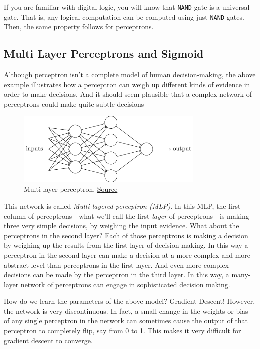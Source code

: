 \documentclass[a4paper]{tufte-handout}
\begin{document}
If you are familiar with digital logic, you will know that \texttt{NAND}
gate is a universal gate. That is, any logical computation can be
computed using just \texttt{NAND} gates. Then, the same property follows
for perceptrons.

\subsection{Multi Layer Perceptrons and Sigmoid}
\label{multi-layer-perceptrons-and-sigmoid}

Although perceptron isn't a complete model of human decision-making, the
above example illustrates how a perceptron can weigh up different kinds
of evidence in order to make decisions. And it should seem plausible
that a complex network of perceptrons could make quite subtle decisions

\begin{figure}
  \includegraphics[height=35mm]{tikz1}
  \caption{Multi layer perceptron.
\href{http://neuralnetworksanddeeplearning.com/chap1.html}{Source} }
\end{figure}

This network is called \emph{Multi layered perceptron (MLP)}. In this
MLP, the first column of perceptrons - what we'll call the first
\emph{layer} of perceptrons - is making three very simple decisions, by
weighing the input evidence. What about the perceptrons in the second
layer? Each of those perceptrons is making a decision by weighing up the
results from the first layer of decision-making. In this way a
perceptron in the second layer can make a decision at a more complex and
more abstract level than perceptrons in the first layer. And even more
complex decisions can be made by the perceptron in the third layer. In
this way, a many-layer network of perceptrons can engage in
sophisticated decision making.

How do we learn the parameters of the above model? Gradient Descent!
However, the network is very discontinuous. In fact, a small change in
the weights or bias of any single perceptron in the network can
sometimes cause the output of that perceptron to completely flip, say
from 0 to 1. This makes it very difficult for gradient descent to
converge.
\end{document}
